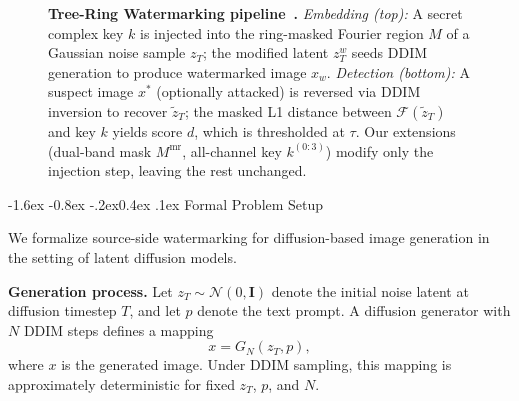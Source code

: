 \documentclass[10pt,twocolumn]{article}
\makeatletter
\renewcommand\subsection{\@startsection{subsection}{2}{\z@}%
  {-1.6ex \@plus -0.8ex \@minus -.2ex}{0.4ex \@plus .1ex}%
  {\normalfont\normalsize\itshape}}
\makeatother
\begin{document}
\begin{figure}[tp]
\caption{\textbf{Tree-Ring Watermarking pipeline~\cite{wen2023treering}.}
  \emph{Embedding (top):} A secret complex key $k$ is injected into the
  ring-masked Fourier region $M$ of a Gaussian noise sample $z_T$;
  the modified latent $z_T^w$ seeds DDIM generation to produce
  watermarked image $x_w$.
  \emph{Detection (bottom):} A suspect image $x^*$ (optionally attacked)
  is reversed via DDIM inversion to recover $\tilde{z}_T$; the masked
  L1 distance between $\mathcal{F}(\tilde{z}_T)$ and key $k$ yields
  score $d$, which is thresholded at $\tau$.
  Our extensions (dual-band mask $M^{\mathrm{mr}}$, all-channel key
  $k^{(0:3)}$) modify only the injection step, leaving the rest unchanged.}
\label{fig:pipeline}
\end{figure}

\subsection{Formal Problem Setup}

We formalize source-side watermarking for diffusion-based image
generation in the setting of latent diffusion models.

\textbf{Generation process.}
Let $z_T \sim \mathcal{N}(0,\mathbf{I})$ denote the initial noise latent
at diffusion timestep $T$, and let $p$ denote the text prompt.
A diffusion generator with $N$ DDIM steps defines a mapping
\begin{equation}
    x = G_N(z_T, p),
\end{equation}
where $x$ is the generated image.
Under DDIM sampling, this mapping is approximately deterministic for
fixed $z_T$, $p$, and $N$.
\end{document}
